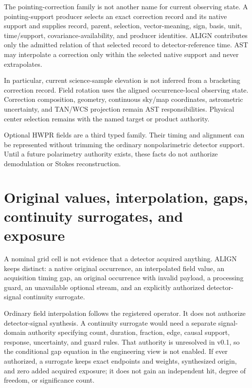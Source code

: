\documentclass[10pt]{article}
\begin{document}
The pointing-correction family is not another name for current observing
state.  A pointing-support producer selects an exact correction record and its
native support and supplies record, parent, selection, vector-meaning, sign,
basis, unit, time/support, covariance-availability, and producer identities.
ALIGN contributes only the admitted relation of that selected record to
detector-reference time.  AST may interpolate a correction only within the
selected native support and never extrapolates.

In particular, current science-sample elevation is not inferred from a
bracketing correction record.  Field rotation uses the aligned
occurrence-local observing state.  Correction composition, geometry,
continuous sky/map coordinates, astrometric uncertainty, and TAN/WCS
projection remain AST responsibilities.  Physical center selection remains
with the named target or product authority.

Optional HWPR fields are a third typed family.  Their timing and alignment can
be represented without trimming the ordinary nonpolarimetric detector
support.  Until a future polarimetry authority exists, these facts do not
authorize demodulation or Stokes reconstruction.

\clearpage
\section{Original values, interpolation, gaps, continuity surrogates, and exposure}

A nominal grid cell is not evidence that a detector acquired anything.  ALIGN
keeps distinct: a native original occurrence, an interpolated field value, an
acquisition timing gap, an original occurrence with invalid payload, a
processing guard, an unavailable optional stream, and an explicitly
authorized detector-signal continuity surrogate.

Ordinary field interpolation follows the registered operator.  It does not
authorize detector-signal synthesis.  A continuity surrogate would need a
separate signal-domain authority specifying count, duration, fraction, edge,
causal support, response, uncertainty, and guard rules.  That authority is
unresolved in v0.1, so the conditional gap equation in the engineering view
is not enabled.  If ever authorized, a surrogate keeps exact endpoints and
weights, synthesized origin, and zero added acquired exposure; it does not
gain an independent hit, degree of freedom, or significance count.
\end{document}
